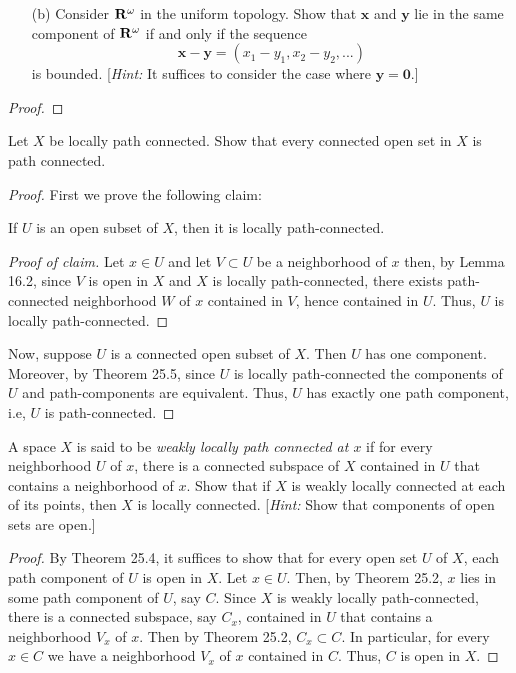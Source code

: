 \newpage
\begin{problem}[Munkres \S25, Ex.\,2(b)]
\begin{enumerate}[noitemsep]
\item[(b)] Consider $\mathbf{R}^\omega$ in the uniform topology. Show
  that $\mathbf{x}$ and $\mathbf{y}$ lie in the same component of
  $\mathbf{R}^\omega$ if and only if the sequence
  \[
    \mathbf{x}-\mathbf{y}=(x_1-y_1,x_2-y_2,...)
  \]
  is bounded. [\emph{Hint:} It suffices to consider the case
  where $\mathbf{y}=\mathbf{0}$.]
\end{enumerate}
\end{problem}
\begin{proof}
\end{proof}
\newpage
\begin{problem}[Munkres \S25, Ex.\,4]
Let $X$ be locally path connected. Show that every connected open
set in $X$ is path connected.
\end{problem}
\begin{proof}
First we prove the following claim:
\begin{claim*}
If $U$ is an open subset of $X$, then it is locally
path-connected.
\end{claim*}
\begin{proof}[Proof of claim]
\renewcommand\qedsymbol{$\spadesuit$}
Let $x\in U$ and let $V\subset U$ be a neighborhood of $x$ then,
by Lemma 16.2, since $V$ is open in $X$ and $X$ is locally
path-connected, there exists path-connected neighborhood $W$ of
$x$ contained in $V$, hence contained in $U$. Thus, $U$ is
locally path-connected.
\end{proof}
Now, suppose $U$ is a connected open subset of $X$. Then $U$ has
one component. Moreover, by Theorem 25.5, since $U$ is locally
path-connected the components of $U$ and path-components are
equivalent. Thus, $U$ has exactly one path component, i.e, $U$ is
path-connected.
\end{proof}
\newpage
\begin{problem}[Munkres \S25, Ex.\,6]
A space $X$ is said to be \emph{weakly locally path connected at
  $x$} if for every neighborhood $U$ of $x$, there is a connected
subspace of $X$ contained in $U$ that contains a neighborhood of
$x$. Show that if $X$ is weakly locally connected at each of its
points, then $X$ is locally connected. [\emph{Hint:} Show that
components of open sets are open.]
\end{problem}
\begin{proof}
By Theorem 25.4, it suffices to show that for every open set $U$
of $X$, each path component of $U$ is open in $X$. Let $x\in
U$. Then, by Theorem 25.2, $x$ lies in some path component of
$U$, say $C$. Since $X$ is weakly locally path-connected, there
is a connected subspace, say $C_x$, contained in $U$ that
contains a neighborhood $V_x$ of $x$. Then by Theorem 25.2,
$C_x\subset C$. In particular, for every $x\in C$ we have a
neighborhood $V_x$ of $x$ contained in $C$. Thus, $C$ is open in
$X$.
\end{proof}
